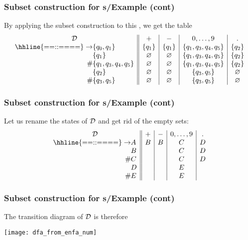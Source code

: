 % 
\begin{frame}
\frametitle{Subset construction for {\eNFA}s/Example (cont)}

By applying the subset construction to this \eNFA, we get the table
\[
\begin{array}{r@{}l||c|c|c|c}
\multicolumn{2}{c||}{\cal D} & + & - & 0, \ldots, 9 & \mathtt{.}\\
\hhline{==::====}
\rightarrow 
   & \{q_0,q_1\} 
             & \{q_1\} & \{q_1\} & \{q_1, q_3, q_4, q_5\} & \{q_2\}\\
   & \{q_1\} & \varnothing  & \varnothing & \{q_1, q_3, q_4, q_5\} 
             & \{q_2\}\\
\# & \{q_1, q_3, q_4, q_5\} 
             & \varnothing  & \varnothing & \{q_1, q_3, q_4, q_5\} 
             & \{q_2\}\\
   & \{q_2\} & \varnothing & \varnothing & \{q_3, q_5\} & \varnothing\\
\# & \{q_3, q_5\}
             & \varnothing & \varnothing & \{q_3, q_5\} & \varnothing
\end{array}
\]

\end{frame}

% 
\begin{frame}
\frametitle{Subset construction for {\eNFA}s/Example (cont)}

Let us rename the states of \(\cal D\) and get rid of the empty sets:
\[
\begin{array}{r@{}l||c|c|c|c}
\multicolumn{2}{c||}{\cal D} & + & - & 0, \ldots, 9 & \mathtt{.}\\
\hhline{==::====}
\rightarrow 
   & A & B & B & C & D\\
   & B &   &   & C & D\\
\# & C &   &   & C & D\\
   & D &   &   & E &\\
\# & E &   &   & E &
\end{array}
\]

\end{frame}

% 
\begin{frame}
\frametitle{Subset construction for {\eNFA}s/Example (cont)}

The transition diagram of \(\cal D\) is therefore
\begin{center}
\texttt{[image: dfa\_from\_enfa\_num]}
\end{center}

\end{frame}

